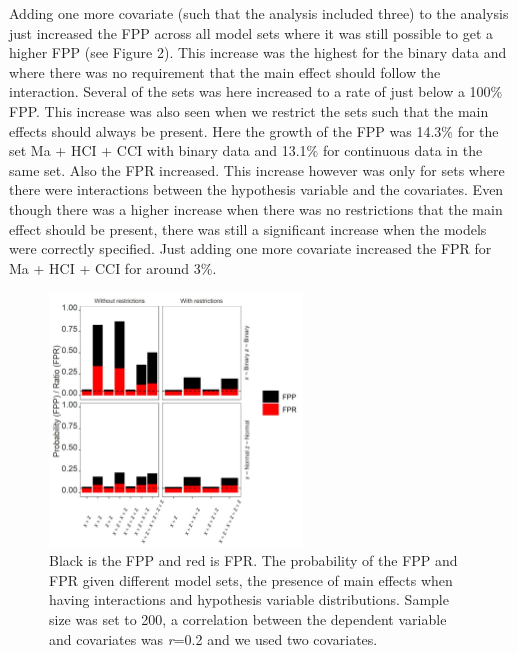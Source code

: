 Adding one more covariate (such that the analysis included three) to the analysis just increased the FPP across all model sets where it was still possible to get a higher FPP (see Figure 2). This increase was the highest for the binary data and where there was no requirement that the main effect should follow the interaction. Several of the sets was here increased to a rate of just below a 100\% FPP. This increase was also seen when we restrict the sets such that the main effects should always be present. Here the growth of the FPP was 14.3\% for the set Ma + HCI + CCI with binary data and 13.1\% for continuous data in the same set. Also the FPR increased. This increase however was only for sets where there were interactions between the hypothesis variable and the covariates. Even though there was a higher increase when there was no restrictions that the main effect should be present, there was still a significant increase when the models were correctly specified. Just adding one more covariate increased the FPR for Ma + HCI + CCI for around 3\%. 

\begin{figure}[t]
\includegraphics[width=0.6\textwidth]{R/Analysis/Result/Figures/Figure1A.jpeg}
\centering
\caption{Black is the FPP and red is FPR. The probability of the FPP and FPR given different model sets, the presence of main effects when having interactions and hypothesis variable distributions. Sample size was set to 200, a correlation between the dependent variable and covariates was \textit{r}=0.2 and we used two covariates.}
\label{fig:mainfigure}
\end{figure}

